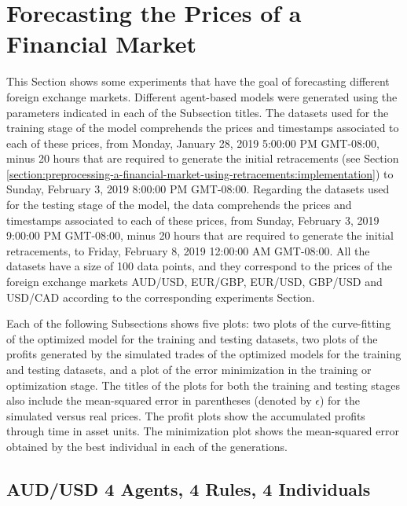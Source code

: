 \section{Forecasting the Prices of a Financial Market}
\label{section:forecasting-the-prices-of-a-financial-market}

This Section shows some experiments that have the goal of forecasting different
foreign exchange markets. Different agent-based models were generated using the
parameters indicated in each of the Subsection titles. The datasets used for the
training stage of the model comprehends the prices and timestamps associated to
each of these prices, from Monday, January 28, 2019 5:00:00 PM GMT-08:00, minus
20 hours that are required to generate the initial retracements (see Section
\ref{section:preprocessing-a-financial-market-using-retracements:implementation})
to Sunday, February 3, 2019 8:00:00 PM GMT-08:00. Regarding the datasets used
for the testing stage of the model, the data comprehends the prices and
timestamps associated to each of these prices, from Sunday, February 3, 2019
9:00:00 PM GMT-08:00, minus 20 hours that are required to generate the initial
retracements, to Friday, February 8, 2019 12:00:00 AM GMT-08:00. All the
datasets have a size of 100 data points, and they correspond to the prices of
the foreign exchange markets AUD/USD, EUR/GBP, EUR/USD, GBP/USD and USD/CAD
according to the corresponding experiments Section.

Each of the following Subsections shows five plots: two plots of the
curve-fitting of the optimized model for the training and testing datasets, two
plots of the profits generated by the simulated trades of the optimized models
for the training and testing datasets, and a plot of the error minimization in
the training or optimization stage. The titles of the plots for both the
training and testing stages also include the mean-squared error in parentheses
(denoted by $\epsilon$) for the simulated versus real prices. The profit plots
show the accumulated profits through time in asset units. The minimization plot
shows the mean-squared error obtained by the best individual in each of the
generations.

\newpage

\subsection{AUD/USD 4 Agents, 4 Rules, 4 Individuals}
\label{results:forecast-aud-usd-4agents-4rules-4individuals}

